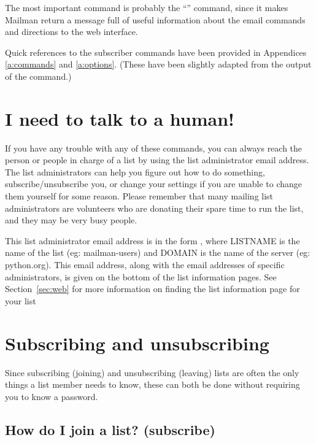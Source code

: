 \documentclass{howto}
\begin{document}
The most important command is probably the ``'' command, since it 
makes Mailman return a message full of useful information about the
email commands and directions to the web interface.

Quick references to the subscriber commands have been provided in 
Appendices \ref{a:commands} and \ref{a:options}. (These have been slightly
adapted from the output of the  command.)


\section{I need to talk to a human!\label{sec:human}}

If you have any trouble with any of these commands, you can always reach the
person or people in charge of a list by using the list administrator email address. 
The list administrators can help you figure out
how to do something, subscribe/unsubscribe you, or change your 
settings if you are unable to change them yourself for some reason.  Please
remember that many mailing list administrators are volunteers who are donating
their spare time to run the list, and they may be very busy people.

This list administrator email address is in the form , where LISTNAME is the name of the list (eg: mailman-users) and DOMAIN is
the name of the server (eg: python.org).  
This email address, 
along with the email addresses of specific administrators, is given on the 
bottom of the list information pages. See Section~\ref{sec:web} for more 
information on finding the list information page for your list

\section{Subscribing and unsubscribing}
Since subscribing (joining) and unsubscribing (leaving) lists are often the 
only things a list member needs to know, these can both be done without 
requiring you to know a password.

\subsection{How do I join a list? (subscribe)\label{sec:subscribe}}
\end{document}
